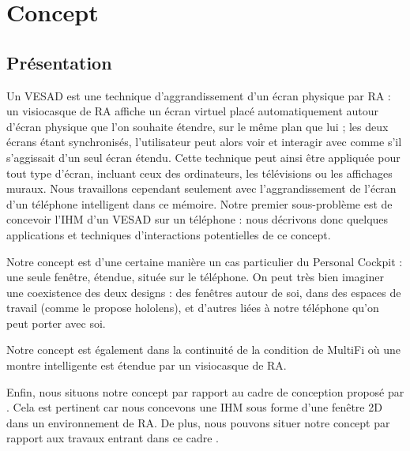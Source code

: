 \chapter{Concept}
\label{ch:concept}

\section{Présentation}
\label{sec:concept_introduction}

Un VESAD est une technique d'aggrandissement d'un écran physique par RA : un visiocasque de RA affiche un écran virtuel placé automatiquement autour d'écran physique que l'on souhaite étendre, sur le même plan que lui ; les deux écrans étant synchronisés, l'utilisateur peut alors voir et interagir avec comme s'il s'aggissait d'un seul écran étendu. Cette technique peut ainsi être appliquée pour tout type d'écran, incluant ceux des ordinateurs, les télévisions ou les affichages muraux. Nous travaillons cependant seulement avec l'aggrandissement de l'écran d'un téléphone intelligent dans ce mémoire. Notre premier sous-problème est de concevoir l'IHM d'un VESAD sur un téléphone : nous décrivons donc quelques applications et techniques d'interactions potentielles de ce concept.

Notre concept est d'une certaine manière un cas particulier du Personal Cockpit : une seule fenêtre, étendue, située sur le téléphone. On peut très bien imaginer une coexistence des deux designs : des fenêtres autour de soi, dans des espaces de travail (comme le propose hololens), et d'autres liées à notre téléphone qu'on peut porter avec soi.

Notre concept est également dans la continuité de la condition  de MultiFi \citep{Grubert2015} où une montre intelligente est étendue par un visiocasque de RA.

Enfin, nous situons notre concept par rapport au cadre de conception proposé par \cite{Ens2014a}. Cela est pertinent car nous concevons une IHM sous forme d'une fenêtre 2D dans un environnement de RA. De plus, nous pouvons situer notre concept par rapport aux travaux entrant dans ce cadre .

